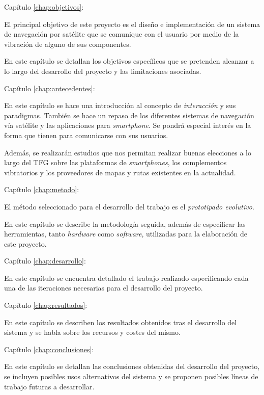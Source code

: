 \begin{definitionlist}
  \item[Capítulo \ref{chap:objetivos}: \nameref{chap:objetivos}] 

  El principal objetivo de este proyecto es el diseño e implementación de un sistema de navegación
  por satélite que se comunique con el usuario por medio de la vibración de alguno de sus
  componentes.

  En este capítulo se detallan los objetivos específicos que se pretenden alcanzar a lo largo
  del desarrollo del proyecto y las limitaciones asociadas.

  \item[Capítulo \ref{chap:antecedentes}: \nameref{chap:antecedentes}]

  En este capítulo se hace una introducción al concepto de \emph{interacción} y sus
  paradigmas. También se hace un repaso de los diferentes sistemas de navegación vía satélite y las
  aplicaciones para \emph{smartphone}. Se pondrá especial interés en la forma que tienen para
  comunicarse con sus usuarios.

  Además, se realizarán estudios que nos permitan realizar buenas elecciones a lo largo del
  \acs{TFG} sobre las plataformas de \emph{smartphones}, los complementos vibratorios y los
  proveedores de mapas y rutas existentes en la actualidad.

  \item[Capítulo \ref{chap:metodo}: \nameref{chap:metodo}]

  El método seleccionado para el desarrollo del trabajo es el \emph{prototipado evolutivo}.

  En este capítulo se describe la metodología seguida, además de especificar las herramientas, tanto
  \emph{hardware} como \emph{software}, utilizadas para la elaboración de este proyecto.

  \item[Capítulo \ref{chap:desarrollo}: \nameref{chap:desarrollo}]

  En este capítulo se encuentra detallado el trabajo realizado especificando cada una de las
  iteraciones necesarias para el desarrollo del proyecto.

  \item[Capítulo \ref{chap:resultados}: \nameref{chap:resultados}]

  En este capítulo se describen los resultados obtenidos tras el desarrollo del sistema y se habla
  sobre los recursos y costes del mismo.

  \item[Capítulo \ref{chap:conclusiones}: \nameref{chap:conclusiones}]

  En este capítulo se detallan las conclusiones obtenidas del desarrollo del proyecto, se
  incluyen posibles usos alternativos del sistema y se proponen posibles líneas de trabajo
  futuras a desarrollar.

\end{definitionlist}

